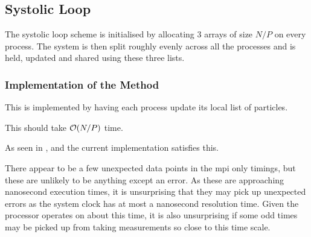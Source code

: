 \subsection{Systolic Loop}

The systolic loop scheme is initialised by allocating 3 arrays of
size $N/P$ on every process.
%
The system is then split roughly evenly across all the processes
and is held, updated and shared using these three lists.


%
%

\subsubsection{Implementation of the \individualoperation{} Method}
This is implemented by having each process update its local list
of particles.

This should take $\mathcal{O}{\left({ N/P }\right)}$ time.

\begin{figure}[!h]
    
    \caption{}
    \label{fig:v0_systolic_individual_operation_512_logtime}
\end  {figure}

\begin{figure}[!h]
    
    \caption{}
    \label{fig:v0_systolic_individual_operation_4096_logtime}
\end  {figure}

\begin{figure}[!h]
    
    \caption{}
    \label{fig:v0_systolic_individual_operation_32768_logtime}
\end  {figure}

As seen in
,
 and
the current implementation satisfies this.

There appear to be a few unexpected data points in the mpi only timings,
but these are unlikely to be anything except an error.
%
As these are approaching nanosecond execution times, it is
unsurprising that they may pick up unexpected errors as the system clock
has at most a nanosecond resolution time.
%
Given the processor operates on about this time, it is also unsurprising
if some odd times may be picked up from taking measurements so
close to this time scale.


